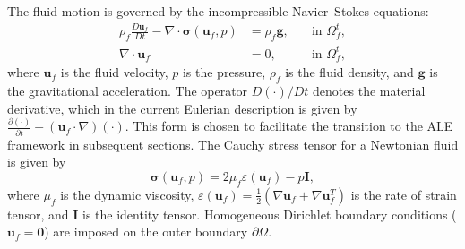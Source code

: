 \documentclass{article}
\newcommand{\bx}{{\mathbf{x}}}
\newcommand{\bu}{{\mathbf{u}}}
\begin{document}
The fluid motion is governed by the incompressible Navier--Stokes equations:
\begin{equation}\label{eq:fluid}
    \begin{aligned}
        \rho_f\frac{D\bu_f}{Dt} - \nabla\cdot\boldsymbol{\sigma}(\bu_f, p) &= \rho_f\mathbf{g}, \quad &\text{in } \Omega_f^t,\\
        \nabla\cdot\bu_f &= 0, \quad &\text{in } \Omega_f^t,
    \end{aligned}
\end{equation}
where $\bu_f$ is the fluid velocity, $p$ is the pressure, $\rho_f$ is the fluid density, and $\mathbf{g}$ is the gravitational acceleration. The operator $D(\cdot)/Dt$ denotes the material derivative, which in the current Eulerian description is given by $\frac{\partial (\cdot)}{\partial t} + (\bu_f \cdot \nabla)(\cdot)$. This form is chosen to facilitate the transition to the ALE framework in subsequent sections. The Cauchy stress tensor for a Newtonian fluid is given by
\begin{equation}\label{eq:stress}
    \boldsymbol{\sigma}(\bu_f, p) = 2\mu_f\varepsilon(\bu_f) - p\mathbf{I},
\end{equation}
where $\mu_f$ is the dynamic viscosity, $\varepsilon(\bu_f) = \frac{1}{2}(\nabla\bu_f + \nabla\bu_f^T)$ is the rate of strain tensor, and $\mathbf{I}$ is the identity tensor. Homogeneous Dirichlet boundary conditions ($\bu_f = \mathbf{0}$) are imposed on the outer boundary $\partial\Omega$.

\end{document}
